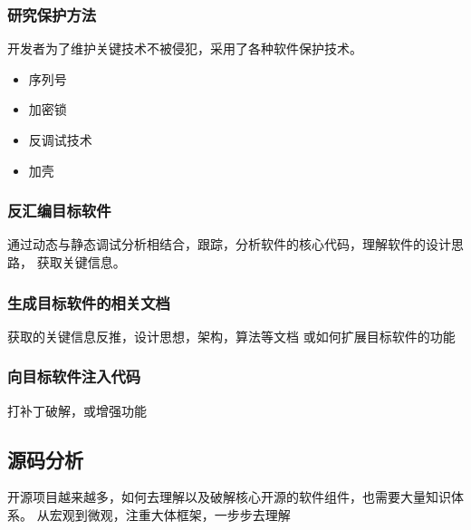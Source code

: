 \subsubsection{研究保护方法}
开发者为了维护关键技术不被侵犯，采用了各种软件保护技术。
\begin{itemize}
    \item {序列号}
    \item {加密锁}
    \item {反调试技术}
    \item {加壳}
\end{itemize}

\subsubsection{反汇编目标软件}
通过动态与静态调试分析相结合，跟踪，分析软件的核心代码，理解软件的设计思路，
获取关键信息。

\subsubsection{生成目标软件的相关文档}
获取的关键信息反推，设计思想，架构，算法等文档
或如何扩展目标软件的功能

\subsubsection{向目标软件注入代码}
打补丁破解，或增强功能


\subsection{源码分析}
开源项目越来越多，如何去理解以及破解核心开源的软件组件，也需要大量知识体系。
从宏观到微观，注重大体框架，一步步去理解
